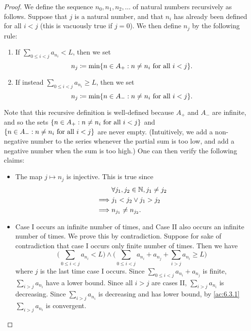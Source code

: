 \begin{proof}
	We define the sequence \(n_0, n_1, n_2, \dots\) of natural numbers recursively as follows.
	Suppose that \(j\) is a natural number, and that \(n_i\) has already been defined for all \(i < j\) (this is vacuously true if \(j = 0\)).
	We then define \(n_j\) by the following rule:
	\begin{enumerate}[label=(\Roman*)]
		\item If \(\sum_{0 \leq i < j} a_{n_i} < L\), then we set
		      \[
			      n_j \coloneqq \min\set{n \in A_+ : n \neq n_i \text{ for all } i < j}.
		      \]
		\item If instead \(\sum_{0 \leq i < j} a_{n_i} \geq L\), then we set
		      \[
			      n_j \coloneqq \min\set{n \in A_- : n \neq n_i \text{ for all } i < j}.
		      \]
	\end{enumerate}
	Note that this recursive definition is well-defined because \(A_+\) and \(A_-\) are infinite, and so the sets \(\left\lbrace n \in A_+ : n \neq n_i \text{ for all } i < j\right\rbrace\) and \(\left\lbrace n \in A_- : n \neq n_i \text{ for all } i < j\right\rbrace\) are never empty.
	(Intuitively, we add a non-negative number to the series whenever the partial sum is too low, and add a negative number when the sum is too high.)
	One can then verify the following claims:
	\begin{itemize}
		\item The map \(j \mapsto n_j\) is injective.
		      This is true since
		      \begin{align*}
			               & \forall j_1, j_2 \in \mathbb{N}, j_1 \neq j_2 \\
			      \implies & j_1 < j_2 \lor j_1 > j_2              \\
			      \implies & n_{j_1} \neq n_{j_2}.
		      \end{align*}
		\item Case I occurs an infinite number of times, and Case II also occurs an infinite number of times.
		      We prove this by contradiction.
		      Suppose for sake of contradiction that case I occurs only finite number of times.
		      Then we have
		      \[
			      \Bigg(\sum_{0 \leq i < j} a_{n_i} < L\Bigg) \land \Bigg(\sum_{0 \leq i < j} a_{n_i} + a_{n_j} + \sum_{i > j} a_{n_i} \geq L\Bigg)
		      \]
		      where \(j\) is the last time case I occurs.
		      Since \(\sum_{0 \leq i < j} a_{n_i} + a_{n_j}\) is finite, \(\sum_{i > j} a_{n_i}\) have a lower bound.
		      Since all \(i > j\) are cases II, \(\sum_{i > j} a_{n_i}\) is decreasing.
		      Since \(\sum_{i > j} a_{n_i}\) is decreasing and has lower bound, by \cref{ac:6.3.1} \(\sum_{i > j} a_{n_i}\) is convergent.

\end{itemize}
\end{proof}

